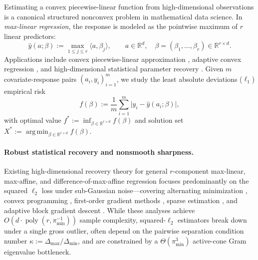\documentclass[11pt]{article}
\theoremstyle{plain}
\theoremstyle{remark}
\numberwithin{equation}{section}
\newcommand{\R}{\mathbb{R}}
\newcommand{\ip}[2]{\langle #1, #2 \rangle}
\newcommand{\argmin}{\operatorname*{arg\,min}}
\begin{document}
Estimating a convex piecewise-linear function from high-dimensional observations is a canonical structured nonconvex problem in mathematical data science. In \emph{max-linear regression}, the response is modeled as the pointwise maximum of $r$ linear predictors:
\begin{equation}
  \label{eq:model}
  \hat y(a; \beta) := \max_{1 \le j \le r} \ip{a}{\beta_j},
  \qquad a \in \R^d,\quad \beta = (\beta_1, \dots, \beta_r) \in \R^{r \times d}.
\end{equation}
Applications include convex piecewise-linear approximation \cite{magnani2009convex}, adaptive convex regression \cite{hannah2013multivariate}, and high-dimensional statistical parameter recovery \cite{ghosh2022maxaffine,kim2024convex,kim2024firstorder,kanj2026sparse,kanj2026doma}. Given $m$ covariate-response pairs $(a_i, y_i)_{i=1}^m$, we study the least absolute deviations ($\ell_1$) empirical risk
\begin{equation}
  \label{eq:emp-loss}
  f(\beta) := \frac{1}{m}\sum_{i=1}^m \bigl|y_i - \hat y(a_i; \beta)\bigr|,
\end{equation}
with optimal value $f^* := \inf_{\beta \in \R^{r\times d}} f(\beta)$ and solution set $X^* := \argmin_{\beta \in \R^{r \times d}} f(\beta)$.

\paragraph{Robust statistical recovery and nonsmooth sharpness.}
Existing high-dimensional recovery theory for general $r$-component max-linear, max-affine, and difference-of-max-affine regression focuses predominantly on the squared $\ell_2$ loss under sub-Gaussian noise---covering alternating minimization \cite{ghosh2022maxaffine}, convex programming \cite{kim2024convex}, first-order gradient methods \cite{kim2024firstorder}, sparse estimation \cite{kanj2026sparse}, and adaptive block gradient descent \cite{kanj2026doma}. While these analyses achieve $O(d \cdot \operatorname{poly}(r, \pi_{\min}^{-1}))$ sample complexity, squared-$\ell_2$ estimators break down under a single gross outlier, often depend on the pairwise separation condition number $\kappa := \Delta_{\max}/\Delta_{\min}$, and are constrained by a $\Theta(\pi_{\min}^3)$ active-cone Gram eigenvalue bottleneck.
\end{document}
